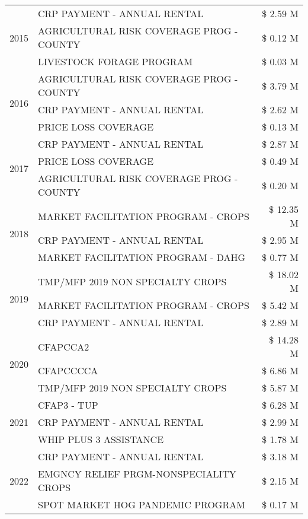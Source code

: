 \begin{tabular}{llr}
\cline{1-3}
\multirow[t]{3}{*}{2015} & CRP PAYMENT - ANNUAL RENTAL & \$ 2.59 M \\
 & AGRICULTURAL RISK COVERAGE PROG - COUNTY & \$ 0.12 M \\
 & LIVESTOCK FORAGE PROGRAM & \$ 0.03 M \\
\cline{1-3}
\multirow[t]{3}{*}{2016} & AGRICULTURAL RISK COVERAGE PROG - COUNTY & \$ 3.79 M \\
 & CRP PAYMENT - ANNUAL RENTAL & \$ 2.62 M \\
 & PRICE LOSS COVERAGE & \$ 0.13 M \\
\cline{1-3}
\multirow[t]{3}{*}{2017} & CRP PAYMENT - ANNUAL RENTAL & \$ 2.87 M \\
 & PRICE LOSS COVERAGE & \$ 0.49 M \\
 & AGRICULTURAL RISK COVERAGE PROG - COUNTY & \$ 0.20 M \\
\cline{1-3}
\multirow[t]{3}{*}{2018} & MARKET FACILITATION PROGRAM - CROPS & \$ 12.35 M \\
 & CRP PAYMENT - ANNUAL RENTAL & \$ 2.95 M \\
 & MARKET FACILITATION PROGRAM - DAHG & \$ 0.77 M \\
\cline{1-3}
\multirow[t]{3}{*}{2019} & TMP/MFP 2019 NON SPECIALTY CROPS & \$ 18.02 M \\
 & MARKET FACILITATION PROGRAM - CROPS & \$ 5.42 M \\
 & CRP PAYMENT - ANNUAL RENTAL & \$ 2.89 M \\
\cline{1-3}
\multirow[t]{3}{*}{2020} & CFAPCCA2 & \$ 14.28 M \\
 & CFAPCCCCA & \$ 6.86 M \\
 & TMP/MFP 2019 NON SPECIALTY CROPS & \$ 5.87 M \\
\cline{1-3}
\multirow[t]{3}{*}{2021} & CFAP3 - TUP & \$ 6.28 M \\
 & CRP PAYMENT - ANNUAL RENTAL & \$ 2.99 M \\
 & WHIP PLUS 3 ASSISTANCE & \$ 1.78 M \\
\cline{1-3}
\multirow[t]{3}{*}{2022} & CRP PAYMENT - ANNUAL RENTAL & \$ 3.18 M \\
 & EMGNCY RELIEF PRGM-NONSPECIALITY CROPS & \$ 2.15 M \\
 & SPOT MARKET HOG PANDEMIC PROGRAM & \$ 0.17 M \\
\cline{1-3}
\bottomrule
\end{tabular}
